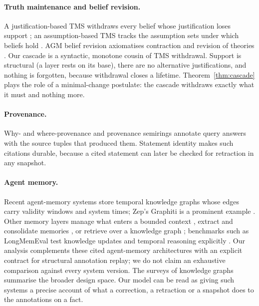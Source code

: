 \documentclass[11pt]{article}
\theoremstyle{plain}
\theoremstyle{definition}
\theoremstyle{remark}
\begin{document}
\paragraph{Truth maintenance and belief revision.}
A justification-based TMS withdraws every belief whose justification loses
support \cite{doyle1979tms}; an assumption-based TMS tracks the assumption sets
under which beliefs hold \cite{dekleer1986atms}. AGM belief revision axiomatises
contraction and revision of theories \cite{alchourron1985logic}. Our cascade is a
syntactic, monotone cousin of TMS withdrawal. Support is structural (a layer
rests on its base), there are no alternative justifications, and nothing is
forgotten, because withdrawal closes a lifetime. Theorem~\ref{thm:cascade}
plays the role of a minimal-change postulate: the cascade withdraws exactly what
it must and nothing more.

\paragraph{Provenance.}
Why- and where-provenance \cite{buneman2001why} and provenance semirings
\cite{green2007provenance} annotate query answers with the source tuples that
produced them. Statement identity makes such citations durable, because a cited
statement can later be checked for retraction in any snapshot.

\paragraph{Agent memory.}
Recent agent-memory systems store temporal knowledge graphs whose edges carry
validity windows and system times; Zep's Graphiti is a prominent example
\cite{rasmussen2025zep}. Other memory layers manage what enters a bounded context
\cite{packer2023memgpt}, extract and consolidate memories
\cite{chhikara2025mem0,xu2025amem}, or retrieve over a knowledge graph
\cite{gutierrez2024hipporag}; benchmarks such as LongMemEval test knowledge updates
and temporal reasoning explicitly \cite{wu2024longmemeval}. Our analysis
complements these cited agent-memory architectures with an explicit contract
for structural annotation replay; we do not claim an exhaustive comparison
against every system version. The surveys of knowledge graphs \cite{hogan2021knowledge}
summarise the broader design space. Our model can be read as giving such
systems a precise account of what a correction, a retraction or a snapshot
does to the annotations on a fact.
\end{document}
